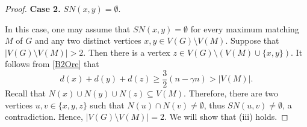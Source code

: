 \documentclass[11pt, a4paper]{article}
\theoremstyle{definition}
\newcommand{\<}{\subseteq}
\begin{document}
\begin{proof}


\medskip
{\bf Case 2.} %
$SN(x,y)=\emptyset.$
\medskip

In this case, one may assume that 
$SN(x,y)=\emptyset$ for every maximum matching $M$ of $G$ and any two distinct  vertices $x,y\in V(G)\setminus V(M)$. Suppose that  $|V(G)\setminus V(M)|>2$. Then there is a vertex $z\in V(G)\setminus (V(M)\cup \{x,y\})$. It follows from  \eqref{B2Ore} that 
$$d(x)+d(y)+d(z)\ge \frac{3}{2}(n-\gamma n)>|V(M)|.$$ 
Recall that $N(x)\cup N(y)\cup N(z)\subseteq V(M)$. Therefore, there are two vertices $u,v\in \{x,y,z\}$ such that $N(u)\cap N(v)\neq \emptyset$, thus $SN(u,v)\neq \emptyset$, a contradiction. Hence, $|V(G)\setminus V(M)|=2$. We will show that (iii) holds. 



\end{proof}
\end{document}

